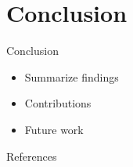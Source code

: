 \documentclass{beamer}
\begin{document}
\section{Conclusion}

\begin{frame}{Conclusion}
  \begin{itemize}
    \item Summarize findings
    \item Contributions
    \item Future work
  \end{itemize}
\end{frame}

\begin{frame}[allowframebreaks]{References}
  
  
\end{frame}
\end{document}
